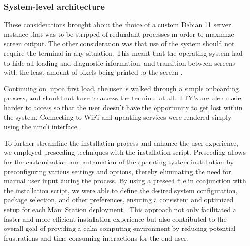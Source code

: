 \documentclass[letterpaper,twocolumn,10pt]{article}
\begin{document}
\subsubsection{System-level architecture}

These considerations brought about the choice of a custom Debian 11 server instance that was to be stripped of redundant processes in order to maximize screen output. The other consideration was that use of the system should not require the terminal in any situation. This meant that the operating system had to hide all loading and diagnostic information, and transition between screens with the least amount of pixels being printed to the screen \cite{deb11-performance}.

Continuing on, upon first load, the user is walked through a simple onboarding process, and should not have to access the terminal at all. TTY’s are also made harder to access so that the user doesn’t have the opportunity to get lost within the system. Connecting to WiFi and updating services were rendered simply using the nmcli interface.

To further streamline the installation process and enhance the user experience, we employed preseeding techniques with the installation script. Preseeding allows for the customization and automation of the operating system installation by preconfiguring various settings and options, thereby eliminating the need for manual user input during the process. By using a preseed file in conjunction with the installation script, we were able to define the desired system configuration, package selection, and other preferences, ensuring a consistent and optimized setup for each Mani Station deployment \cite{deb11-preseed}. This approach not only facilitated a faster and more efficient installation experience but also contributed to the overall goal of providing a calm computing environment by reducing potential frustrations and time-consuming interactions for the end user.
\end{document}
